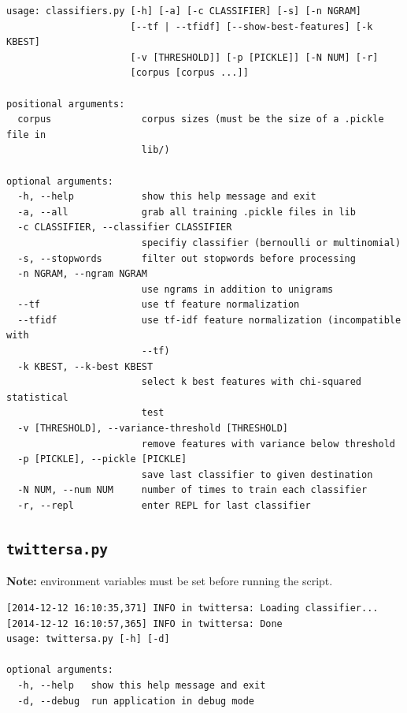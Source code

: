 \documentclass[letter,12pt]{article}
\begin{document}
\begingroup
\fontsize{10pt}{12pt}\selectfont
\begin{verbatim}
usage: classifiers.py [-h] [-a] [-c CLASSIFIER] [-s] [-n NGRAM]
                      [--tf | --tfidf] [--show-best-features] [-k KBEST]
                      [-v [THRESHOLD]] [-p [PICKLE]] [-N NUM] [-r]
                      [corpus [corpus ...]]

positional arguments:
  corpus                corpus sizes (must be the size of a .pickle file in
                        lib/)

optional arguments:
  -h, --help            show this help message and exit
  -a, --all             grab all training .pickle files in lib
  -c CLASSIFIER, --classifier CLASSIFIER
                        specifiy classifier (bernoulli or multinomial)
  -s, --stopwords       filter out stopwords before processing
  -n NGRAM, --ngram NGRAM
                        use ngrams in addition to unigrams
  --tf                  use tf feature normalization
  --tfidf               use tf-idf feature normalization (incompatible with
                        --tf)
  -k KBEST, --k-best KBEST
                        select k best features with chi-squared statistical
                        test
  -v [THRESHOLD], --variance-threshold [THRESHOLD]
                        remove features with variance below threshold
  -p [PICKLE], --pickle [PICKLE]
                        save last classifier to given destination
  -N NUM, --num NUM     number of times to train each classifier
  -r, --repl            enter REPL for last classifier
\end{verbatim}
\endgroup

\subsection{\texttt{twittersa.py}}
\label{sub:twittersa}

\textbf{Note:} environment variables must be set before running the script.

\begingroup
\fontsize{10pt}{12pt}\selectfont
\begin{verbatim}
[2014-12-12 16:10:35,371] INFO in twittersa: Loading classifier...
[2014-12-12 16:10:57,365] INFO in twittersa: Done
usage: twittersa.py [-h] [-d]

optional arguments:
  -h, --help   show this help message and exit
  -d, --debug  run application in debug mode
\end{verbatim}
\endgroup


\end{document}
